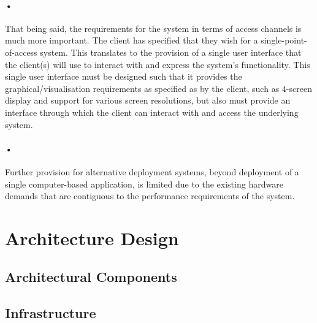 \documentclass[11pt]{article}
\begin{document}
\paragraph{•}
That being said, the requirements for the system in terms of access channels is much more important. The client has specified that they wish for a single-point-of-access system. This translates to the provision of a single user interface that the client(s) will use to interact with and express the system's functionality. This single user interface must be designed such that it provides the graphical/visualisation requirements as specified as by the client, such as 4-screen display and support for various screen resolutions, but also must provide an interface through which the client can interact with and access the underlying system.

\paragraph{•}
Further provision for alternative deployment systems, beyond deployment of a single computer-based application, is limited due to the existing hardware demands that are contiguous to the performance requirements of the system.

\section{Architecture Design}
\subsection{Architectural Components}
\subsection{Infrastructure}
\end{document}

